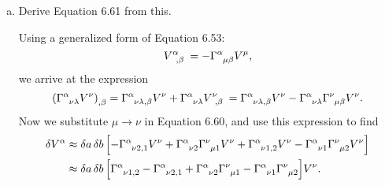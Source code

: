 \documentclass[gr-notes.tex]{subfiles}
\begin{document}
\begin{enumerate}[(a)]
\item Derive Equation 6.61 from this.

Using a generalized form of Equation 6.53:
%
\begin{displaymath}
  \tensor{V}{^\alpha_{,\beta}} =
  -\tensor{\Gamma}{^\alpha_{\mu\beta}} V^\mu,
\end{displaymath}
%
we arrive at the expression
%
\begin{displaymath}
  \qty(\tensor{\Gamma}{^\alpha_{\nu\lambda}} V^\nu)_{,\beta} =
  \tensor{\Gamma}{^\alpha_{\nu\lambda,\beta}} V^\nu +
  \tensor{\Gamma}{^\alpha_{\nu\lambda}} \tensor{V}{^\nu_{,\beta}} =
  \tensor{\Gamma}{^\alpha_{\nu\lambda,\beta}} V^\nu -
  \tensor{\Gamma}{^\alpha_{\nu\lambda}}
  \tensor{\Gamma}{^\nu_{\mu\beta}}
  V^\nu.
\end{displaymath}
%
Now we substitute $\mu \to \nu$ in Equation 6.60, and use this expression to find
%
\begin{align*}
  \var{V^\alpha} &\approx
  \var{a} \var{b} \qty[
   -\tensor{\Gamma}{^\alpha_{\nu2,1}} V^\nu +
    \tensor{\Gamma}{^\alpha_{\nu2}}
    \tensor{\Gamma}{^\nu_{\mu1}}
    V^\nu +
    \tensor{\Gamma}{^\alpha_{\nu1,2}} V^\nu -
    \tensor{\Gamma}{^\alpha_{\nu1}}
    \tensor{\Gamma}{^\nu_{\mu2}}
    V^\nu
  ]
  \\ &\approx
  \var{a} \var{b} \qty[
    \tensor{\Gamma}{^\alpha_{\nu1,2}} -
    \tensor{\Gamma}{^\alpha_{\nu2,1}} +
    \tensor{\Gamma}{^\alpha_{\nu2}}
    \tensor{\Gamma}{^\nu_{\mu1}} -
    \tensor{\Gamma}{^\alpha_{\nu1}}
    \tensor{\Gamma}{^\nu_{\mu2}}
  ]
  V^\nu.
\end{align*}

\end{enumerate}
\end{document}
